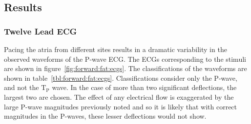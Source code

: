 \subsection{Results}

\subsubsection{Twelve Lead ECG}

Pacing the atria from different sites results in a dramatic variability in the
observed waveforms of the P-wave ECG.
The ECGs corresponding to the stimuli are shown in
figure~\ref{fig:forward:fat:ecgs}.
The classifications of the waveforms are shown in
table~\ref{tbl:forward:fat:ecgs}.
Classifications consider only the P-wave, and not the $\text{T}_{\text{P}}$
wave.
In the case of more than two significant deflections, the largest two are
chosen.
The effect of any electrical flow is exaggerated by the large P-wave magnitudes
previously noted and so it is likely that with correct magnitudes in the
P-waves, these lesser deflections would not show.



